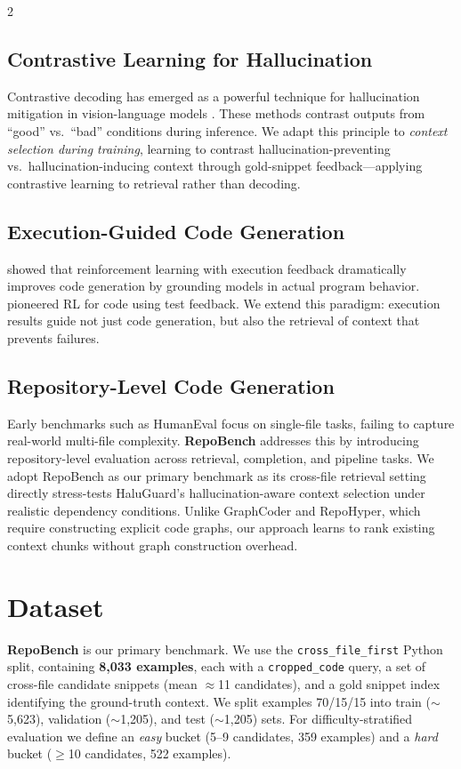 \documentclass[11pt,a4paper]{article}
\begin{document}
\begin{multicols}{2}
\subsection{Contrastive Learning for Hallucination}

Contrastive decoding has emerged as a powerful technique for hallucination mitigation in vision-language models \citep{wang2024contrastive, leng2024mitigating}. These methods contrast outputs from ``good'' vs.\ ``bad'' conditions during inference. We adapt this principle to \textit{context selection during training}, learning to contrast hallucination-preventing vs.\ hallucination-inducing context through gold-snippet feedback---applying contrastive learning to retrieval rather than decoding.

\subsection{Execution-Guided Code Generation}

\citet{gehring2024rlef} showed that reinforcement learning with execution feedback dramatically improves code generation by grounding models in actual program behavior. \citet{le2022coderl} pioneered RL for code using test feedback. We extend this paradigm: execution results guide not just code generation, but also the retrieval of context that prevents failures.

\subsection{Repository-Level Code Generation}

Early benchmarks such as HumanEval focus on single-file tasks, failing to capture real-world multi-file complexity. \textbf{RepoBench} \citep{liu2023repobench} addresses this by introducing repository-level evaluation across retrieval, completion, and pipeline tasks. We adopt RepoBench as our primary benchmark as its cross-file retrieval setting directly stress-tests HaluGuard's hallucination-aware context selection under realistic dependency conditions. Unlike GraphCoder and RepoHyper, which require constructing explicit code graphs, our approach learns to rank existing context chunks without graph construction overhead.

\section{Dataset}

\textbf{RepoBench} \citep{liu2023repobench} is our primary benchmark. We use the \texttt{cross\_file\_first} Python split, containing \textbf{8,033 examples}, each with a \texttt{cropped\_code} query, a set of cross-file candidate snippets (mean $\approx$11 candidates), and a gold snippet index identifying the ground-truth context. We split examples 70/15/15 into train ($\sim$5,623), validation ($\sim$1,205), and test ($\sim$1,205) sets. For difficulty-stratified evaluation we define an \textit{easy} bucket (5--9 candidates, 359 examples) and a \textit{hard} bucket ($\geq$10 candidates, 522 examples).


\end{multicols}
\end{document}
